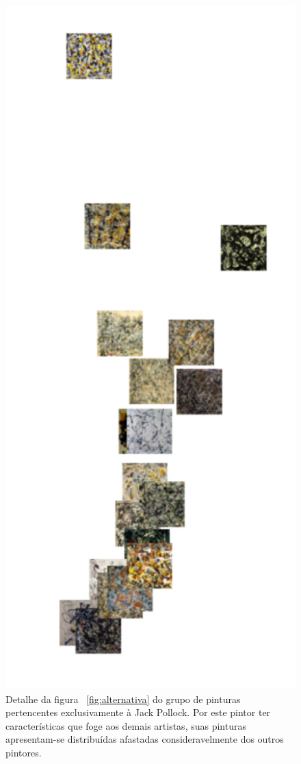\begin{figure}[h!]
  \begin{center}
  \caption{Detalhe da figura ~\ref{fig:alternativa} do grupo de pinturas
    pertencentes exclusivamente à Jack Pollock. Por este pintor ter
    características que foge aos demais artistas, suas pinturas apresentam-se
    distribuídas afastadas consideravelmente dos outros pintores.}
  \label{fig:alternativa2}
    \includegraphics[scale=.4]{figs/detalhe2.pdf}
    \fonteminha
  \end{center}
\end{figure}


